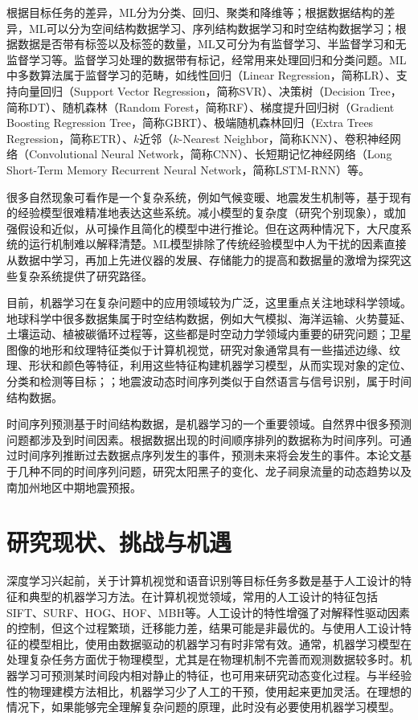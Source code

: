 根据目标任务的差异，ML分为分类、回归、聚类和降维等；根据数据结构的差异，ML可以分为空间结构数据学习、序列结构数据学习和时空结构数据学习；根据数据是否带有标签以及标签的数量，ML又可分为有监督学习、半监督学习和无监督学习等。监督学习处理的数据带有标记，经常用来处理回归和分类问题。ML中多数算法属于监督学习的范畴，如线性回归（Linear Regression，简称LR）、支持向量回归（Support Vector Regression，简称SVR）、决策树（Decision Tree，简称DT）、随机森林（Random Forest，简称RF）、梯度提升回归树（Gradient Boosting Regression Tree，简称GBRT）、极端随机森林回归（Extra Trees Regression，简称ETR）、$k$近邻（$k$-Nearest Neighbor，简称KNN）、卷积神经网络（Convolutional Neural Network，简称CNN）、长短期记忆神经网络（Long Short-Term Memory Recurrent Neural Network，简称LSTM-RNN）等。

很多自然现象可看作是一个复杂系统，例如气候变暖、地震发生机制等\citep{fan2021statistical}，基于现有的经验模型很难精准地表达这些系统。减小模型的复杂度（研究个别现象），或加强假设和近似，从可操作且简化的模型中进行推论。但在这两种情况下，大尺度系统的运行机制难以解释清楚。ML模型排除了传统经验模型中人为干扰的因素直接从数据中学习，再加上先进仪器的发展、存储能力的提高和数据量的激增为探究这些复杂系统提供了研究路径。

目前，机器学习在复杂问题中的应用领域较为广泛，这里重点关注地球科学领域。地球科学中很多数据集属于时空结构数据，例如大气模拟、海洋运输、火势蔓延、土壤运动、植被碳循环过程等，这些都是时空动力学领域内重要的研究问题\citep{mathieu2015deep,oh2015action}；卫星图像的地形和纹理特征类似于计算机视觉，研究对象通常具有一些描述边缘、纹理、形状和颜色等特征，利用这些特征构建机器学习模型，从而实现对象的定位、分类和检测等目标\citep{lee1990neural}；；地震波动态时间序列类似于自然语言与信号识别，属于时间结构数据\citep{rouet2017machine,perol2018convolutional,devries2018deep}。

时间序列预测基于时间结构数据，是机器学习的一个重要领域。自然界中很多预测问题都涉及到时间因素。根据数据出现的时间顺序排列的数据称为时间序列。可通过时间序列推断过去数据点序列发生的事件，预测未来将会发生的事件。本论文基于几种不同的时间序列问题，研究太阳黑子的变化、龙子祠泉流量的动态趋势以及南加州地区中期地震预报。

\section{研究现状、挑战与机遇}\label{sec:intro_veiw}

深度学习兴起前，关于计算机视觉和语音识别等目标任务多数是基于人工设计的特征和典型的机器学习方法。在计算机视觉领域，常用的人工设计的特征包括SIFT、SURF、HOG、HOF、MBH等。人工设计的特性增强了对解释性驱动因素的控制，但这个过程繁琐，迁移能力差，结果可能是非最优的。与使用人工设计特征的模型相比，使用由数据驱动的机器学习有时非常有效。通常，机器学习模型在处理复杂任务方面优于物理模型，尤其是在物理机制不完善而观测数据较多时。机器学习可预测某时间段内相对静止的特征，也可用来研究动态变化过程。与半经验性的物理建模方法相比，机器学习少了人工的干预，使用起来更加灵活。在理想的情况下，如果能够完全理解复杂问题的原理，此时没有必要使用机器学习模型。

